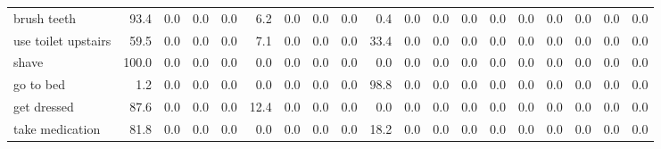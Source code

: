 \documentclass{article}
\begin{document}
\begin{sideways}
\begin{tabular}{lrrrrrrrrrrrrrrrrrr}
brush teeth                   &        93.4 &                0.0 &           0.0 &                          0.0 &                6.2 &                0.0 &                        0.0 &          0.0 &              0.4 &                0.0 &                    0.0 &                      0.0 &                  0.0 &                   0.0 &              0.0 &              0.0 &                                  0.0 &          0.0 \\
use toilet upstairs           &        59.5 &                0.0 &           0.0 &                          0.0 &                7.1 &                0.0 &                        0.0 &          0.0 &             33.4 &                0.0 &                    0.0 &                      0.0 &                  0.0 &                   0.0 &              0.0 &              0.0 &                                  0.0 &          0.0 \\
shave                         &       100.0 &                0.0 &           0.0 &                          0.0 &                0.0 &                0.0 &                        0.0 &          0.0 &              0.0 &                0.0 &                    0.0 &                      0.0 &                  0.0 &                   0.0 &              0.0 &              0.0 &                                  0.0 &          0.0 \\
go to bed                     &         1.2 &                0.0 &           0.0 &                          0.0 &                0.0 &                0.0 &                        0.0 &          0.0 &             98.8 &                0.0 &                    0.0 &                      0.0 &                  0.0 &                   0.0 &              0.0 &              0.0 &                                  0.0 &          0.0 \\
get dressed                   &        87.6 &                0.0 &           0.0 &                          0.0 &               12.4 &                0.0 &                        0.0 &          0.0 &              0.0 &                0.0 &                    0.0 &                      0.0 &                  0.0 &                   0.0 &              0.0 &              0.0 &                                  0.0 &          0.0 \\
take medication               &        81.8 &                0.0 &           0.0 &                          0.0 &                0.0 &                0.0 &                        0.0 &          0.0 &             18.2 &                0.0 &                    0.0 &                      0.0 &                  0.0 &                   0.0 &              0.0 &              0.0 &                                  0.0 &          0.0 \\

\end{tabular}
\end{sideways}
\end{document}
